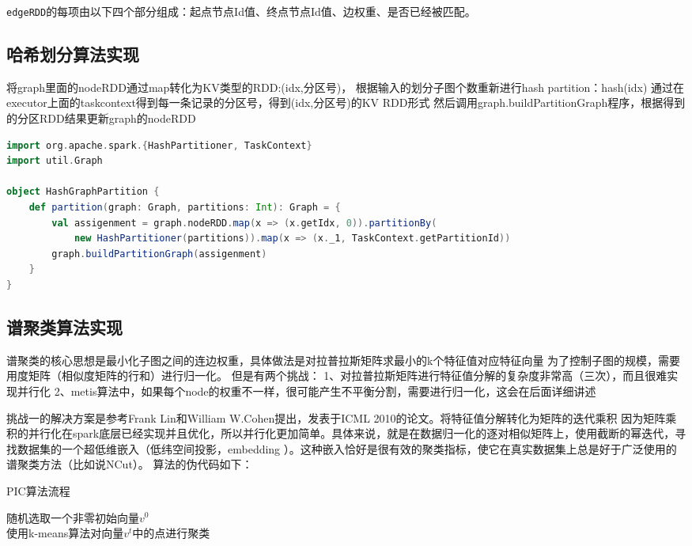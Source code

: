 \texttt{edgeRDD}的每项由以下四个部分组成：起点节点Id值、终点节点Id值、边权重、是否已经被匹配。

\subsection{哈希划分算法实现}
将graph里面的nodeRDD通过map转化为KV类型的RDD:(idx,分区号)，
根据输入的划分子图个数重新进行hash partition：hash(idx)%
通过在executor上面的taskcontext得到每一条记录的分区号，得到(idx,分区号)的KV RDD形式
然后调用graph.buildPartitionGraph程序，根据得到的分区RDD结果更新graph的nodeRDD
\begin{lstlisting}[language=Scala]
import org.apache.spark.{HashPartitioner, TaskContext}
import util.Graph

object HashGraphPartition {
    def partition(graph: Graph, partitions: Int): Graph = {
        val assigenment = graph.nodeRDD.map(x => (x.getIdx, 0)).partitionBy(
            new HashPartitioner(partitions)).map(x => (x._1, TaskContext.getPartitionId))
        graph.buildPartitionGraph(assigenment)
    }
}
\end{lstlisting}

\subsection{谱聚类算法实现}

谱聚类的核心思想是最小化子图之间的连边权重，具体做法是对拉普拉斯矩阵求最小的k个特征值对应特征向量
为了控制子图的规模，需要用度矩阵（相似度矩阵的行和）进行归一化。
但是有两个挑战：
1、对拉普拉斯矩阵进行特征值分解的复杂度非常高（三次），而且很难实现并行化
2、metis算法中，如果每个node的权重不一样，很可能产生不平衡分割，需要进行归一化，这会在后面详细讲述

挑战一的解决方案是参考Frank Lin和William W.Cohen提出，发表于ICML 2010的论文。将特征值分解转化为矩阵的迭代乘积
因为矩阵乘积的并行化在spark底层已经实现并且优化，所以并行化更加简单。具体来说，就是在数据归一化的逐对相似矩阵上，使用截断的幂迭代，寻找数据集的一个超低维嵌入（低纬空间投影，embedding ）。这种嵌入恰好是很有效的聚类指标，使它在真实数据集上总是好于广泛使用的谱聚类方法（比如说NCut）。
算法的伪代码如下：
\begin{algorithm}[htbp]
\caption{PIC算法流程}
\SetAlgoLined
{}
随机选取一个非零初始向量$v^0$ \\
使用k-means算法对向量$v^t$中的点进行聚类
\end{algorithm}

